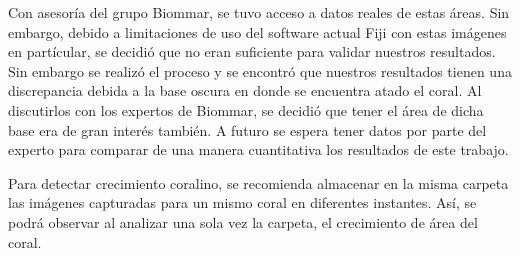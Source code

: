 \documentclass[journal]{IEEEtran}
\begin{document}
\begin{par}
Con asesoría del grupo Biommar, se tuvo acceso a datos reales de
estas áreas. Sin embargo, debido a limitaciones de uso del software
actual Fiji con estas imágenes en partícular, se decidió que no eran
suficiente para validar nuestros resultados. Sin embargo se realizó el
proceso y se encontró que nuestros resultados tienen una discrepancia
debida a la base oscura en donde se encuentra atado el coral. Al
discutirlos con los expertos de Biommar, se decidió que tener el área de
dicha base era de gran interés también. A futuro se espera tener datos
por parte del experto para comparar de una manera cuantitativa los
resultados de este trabajo.
\end{par}

\begin{par}
Para detectar crecimiento coralino, se recomienda almacenar en la misma
carpeta las imágenes capturadas para un mismo coral en diferentes
instantes. Así, se podrá observar al analizar una sola vez la carpeta, el
crecimiento de área del coral.
\end{par}
\end{document}
